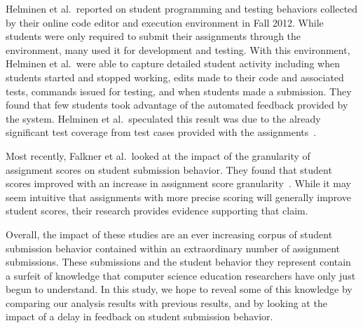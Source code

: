Helminen et al.\ reported on student programming and testing behaviors
collected by their online code editor and execution environment in Fall
2012. While students were only required to submit their assignments through the
environment, many used it for development and testing. With this environment,
Helminen et al.\ were able to capture detailed student activity including when
students started and stopped working, edits made to their code and associated
tests, commands issued for testing, and when students made a submission.  They
found that few students took advantage of the automated feedback provided by
the system. Helminen et al.\ speculated this result was due to the already
significant test coverage from test cases provided with the
assignments~\cite{Helminen:2013:RAI:2526968.2526970}.

Most recently, Falkner et al.\ looked at the impact of the granularity of
assignment scores on student submission behavior. They found that student
scores improved with an increase in assignment score
granularity~\cite{Falkner:2014:IEA:2538862.2538896}. While it may seem
intuitive that assignments with more precise scoring will generally improve
student scores, their research provides evidence supporting that claim.

Overall, the impact of these studies are an ever increasing corpus of student
submission behavior contained within an extraordinary number of assignment
submissions. These submissions and the student behavior they represent contain
a surfeit of knowledge that computer science education researchers have only
just begun to understand. In this study, we hope to reveal some of this
knowledge by comparing our analysis results with previous results, and by
looking at the impact of a delay in feedback on student submission behavior.
